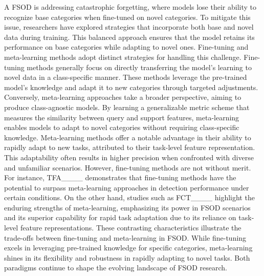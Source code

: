 A FSOD is addressing catastrophic forgetting, where models lose their ability to recognize base categories when fine-tuned on novel categories. To mitigate this issue, researchers have explored strategies that incorporate both base and novel data during training. This balanced approach ensures that the model retains its performance on base categories while adapting to novel ones.
Fine-tuning and meta-learning methods adopt distinct strategies for handling this challenge. Fine-tuning methods generally focus on directly transferring the model’s learning to novel data in a class-specific manner. These methods leverage the pre-trained model’s knowledge and adapt it to new categories through targeted adjustments. Conversely, meta-learning approaches take a broader perspective, aiming to produce class-agnostic models. By learning a generalizable metric scheme that measures the similarity between query and support features, meta-learning enables models to adapt to novel categories without requiring class-specific knowledge.
Meta-learning methods offer a notable advantage in their ability to rapidly adapt to new tasks, attributed to their task-level feature representation. This adaptability often results in higher precision when confronted with diverse and unfamiliar scenarios. However, fine-tuning methods are not without merit. For instance, TFA____ demonstrates that fine-tuning methods have the potential to surpass meta-learning approaches in detection performance under certain conditions. On the other hand, studies such as FCT____ highlight the enduring strengths of meta-learning, emphasizing its power in FSOD scenarios and its superior capability for rapid task adaptation due to its reliance on task-level feature representations.
These contrasting characteristics illustrate the trade-offs between fine-tuning and meta-learning in FSOD. While fine-tuning excels in leveraging pre-trained knowledge for specific categories, meta-learning shines in its flexibility and robustness in rapidly adapting to novel tasks. Both paradigms continue to shape the evolving landscape of FSOD research.


